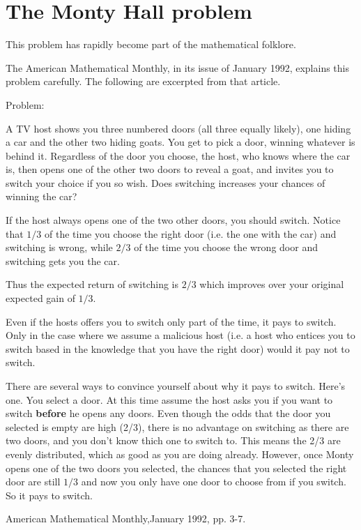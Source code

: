 \section{The Monty Hall problem}

This problem has rapidly become part of the mathematical folklore.

The American Mathematical Monthly, in its issue of January 1992,
explains this problem carefully. The following are excerpted from
that article.

Problem:

A TV host shows you three numbered doors (all three equally likely),
one hiding a car and the other two hiding goats. You get to pick a door,
winning whatever is behind it. Regardless of the door you choose,
the host, who knows where the car is, then opens one of the other
two doors to reveal a goat, and invites you to switch your choice
if you so wish. Does switching increases your chances of winning
the car?

If the host always opens one of the two other doors, you should switch.
Notice that $1/3$ of the time you choose the right door (i.e. the one
with the car) and switching is wrong, while $2/3$ of the time you
choose the wrong door and switching gets you the car.

Thus the expected return of switching is $2/3$ which improves over
your original expected gain of $1/3$.

Even if the hosts offers you to switch only part of the time, it 
pays to switch.
Only in the case where we assume a malicious host (i.e. a host who
entices you to switch based in the knowledge that you have the right
door) would it pay not to switch.

There are several ways to convince yourself about why it pays to switch.
Here's one. You select a door. At this time assume the host asks
you if you want to switch {\bf before} he opens any doors. Even
though the odds that the door you selected is empty are high (2/3), there
is no advantage on switching as there are two doors, and you
don't know thich one to switch to. This means
the 2/3 are evenly distributed, which as good as you are doing already.
However, once Monty opens one of the two doors you selected, the chances 
that you selected the right door are still $1/3$ and now you only have one door to
choose from if you switch. So it pays to switch.


\Ref

        {American Mathematical Monthly,}{January 1992, pp. 3-7.}


